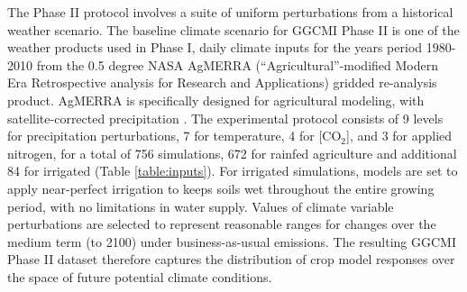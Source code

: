 \documentclass[gmd, manuscript]{copernicus} %
\begin{document}
The Phase II protocol involves a suite of uniform perturbations from a historical weather scenario. 
The baseline climate scenario for GGCMI Phase II is one of the weather products used in Phase I, daily climate inputs for the years period 1980-2010 from the 0.5 degree NASA AgMERRA (``Agricultural''-modified Modern Era Retrospective analysis for Research and Applications) gridded re-analysis product. AgMERRA is specifically designed for agricultural modeling, with satellite-corrected precipitation \citep{Ruane2015}. 
The experimental protocol consists of 9 levels for precipitation perturbations, 7 for temperature, 4 for [CO$_2$], and 3 for applied nitrogen, for a total of 756 simulations, 672 for rainfed agriculture and additional 84 for irrigated (Table \ref{table:inputs}).  For irrigated simulations, models are set to apply near-perfect irrigation to keeps soils wet throughout the entire growing period, with no limitations in water supply. 
Values of climate variable perturbations are selected to represent reasonable ranges for changes over the medium term (to 2100) under business-as-usual emissions. 
The resulting GGCMI Phase II dataset therefore captures the distribution of crop model responses over the space of future potential climate conditions.
\end{document}

